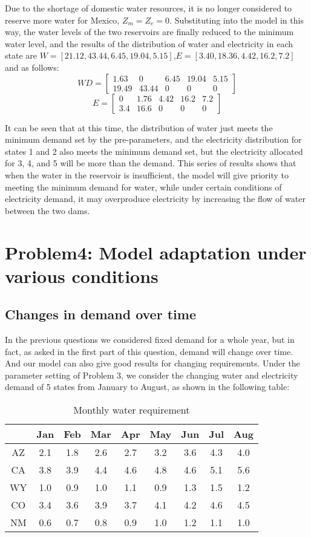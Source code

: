 \documentclass{mcmthesis}
\begin{document}
Due to the shortage of domestic water resources, it is no longer considered to reserve more water for Mexico, $Z_m=Z_e=0$. Substituting into the model in this way, the water levels of the two reservoirs are finally reduced to the minimum water level, and the results of the distribution of water and electricity in each state are $W=[21.12,43.44,6.45,19.04,5.15]$,$E=[3.40,18.36,4.42,16.2,7.2]$ and as follows:
\begin{equation}
	WD=\begin{bmatrix}
		1.63&0&6.45&19.04&5.15\\
		19.49&43.44&0&0&0
	\end{bmatrix}
\end{equation}
\begin{equation}
	E=\begin{bmatrix}
		0&1.76&4.42&16.2&7.2\\
		3.4&16.6&0&0&0
	\end{bmatrix}
\end{equation}

It can be seen that at this time, the distribution of water just meets the minimum demand set by the pre-parameters, and the electricity distribution for states 1 and 2 also meets the minimum demand set, but the electricity allocated for 3, 4, and 5 will be more than the demand. This series of results shows that when the water in the reservoir is insufficient, the model will give priority to meeting the minimum demand for water, while under certain conditions of electricity demand, it may overproduce electricity by increasing the flow of water between the two dams.
\newpage
\section{Problem4: Model adaptation under various conditions}
\subsection{Changes in demand over time}
In the previous questions we considered fixed demand for a whole year, but in fact, as asked in the first part of this question, demand will change over time. And our model can also give good results for changing requirements. Under the parameter setting of Problem 3, we consider the changing water and electricity demand of 5 states from January to August, as shown in the following table:
\begin{table}[h]
	\centering
	\caption{Monthly water requirement}
	\begin{tabular}{ccccccccc}
		\hline
		& Jan & Feb & Mar & Apr & May & Jun & Jul & Aug \\
		\hline
		AZ & 2.1 & 1.8 & 2.6 & 2.7 & 3.2 & 3.6 & 4.3 & 4.0 \\
		CA & 3.8 & 3.9 & 4.4 & 4.6 & 4.8 & 4.6 & 5.1 & 5.6 \\
		WY & 1.0 & 0.9 & 1.0 & 1.1 & 0.9 & 1.3 & 1.5 & 1.2 \\
		CO & 3.4 & 3.6 & 3.9 & 3.7 & 4.1 & 4.2 & 4.6 & 4.5 \\
		NM & 0.6 & 0.7 & 0.8 & 0.9 & 1.0 & 1.2 & 1.1 & 1.0 \\
		\hline
	\end{tabular}
\end{table}
\end{document}
